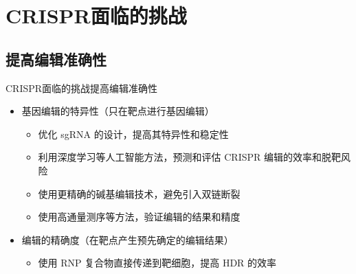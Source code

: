 \documentclass{beamer}
\begin{document}

	\section{CRISPR面临的挑战}
	\subsection{提高编辑准确性}
	\begin{frame}{CRISPR面临的挑战}{提高编辑准确性}
		\begin{itemize}
			\item 基因编辑的特异性（只在靶点进行基因编辑）
			\begin{itemize}
				\item 优化 sgRNA 的设计，提高其特异性和稳定性
				\item 利用深度学习等人工智能方法，预测和评估 CRISPR 编辑的效率和脱靶风险
				\item 使用更精确的碱基编辑技术，避免引入双链断裂
				\item 使用高通量测序等方法，验证编辑的结果和精度
			\end{itemize}
			\item 编辑的精确度（在靶点产生预先确定的编辑结果）
			\begin{itemize}
				\item 使用 RNP 复合物直接传递到靶细胞，提高 HDR 的效率
			\end{itemize}
		\end{itemize}

	\end{frame}
	
\end{document}
